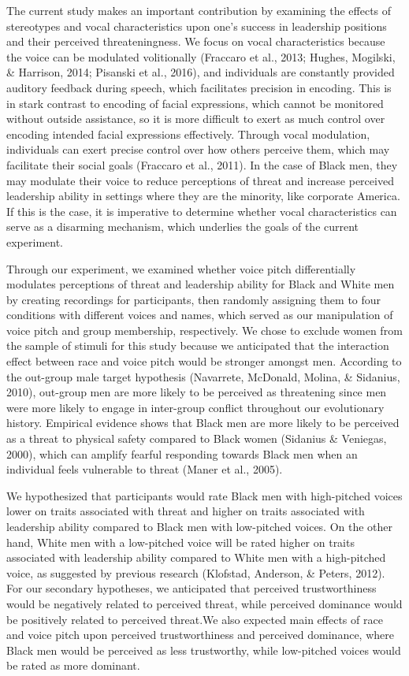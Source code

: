 \documentclass[
  english,
  man, noextraspace,floatsintext]{apa6}
\begin{document}
The current study makes an important contribution by examining the effects of stereotypes and vocal characteristics upon one's success in leadership positions and their perceived threateningness. We focus on vocal characteristics because the voice can be modulated volitionally (Fraccaro et al., 2013; Hughes, Mogilski, \& Harrison, 2014; Pisanski et al., 2016), and individuals are constantly provided auditory feedback during speech, which facilitates precision in encoding. This is in stark contrast to encoding of facial expressions, which cannot be monitored without outside assistance, so it is more difficult to exert as much control over encoding intended facial expressions effectively. Through vocal modulation, individuals can exert precise control over how others perceive them, which may facilitate their social goals (Fraccaro et al., 2011). In the case of Black men, they may modulate their voice to reduce perceptions of threat and increase perceived leadership ability in settings where they are the minority, like corporate America. If this is the case, it is imperative to determine whether vocal characteristics can serve as a disarming mechanism, which underlies the goals of the current experiment.

Through our experiment, we examined whether voice pitch differentially modulates perceptions of threat and leadership ability for Black and White men by creating recordings for participants, then randomly assigning them to four conditions with different voices and names, which served as our manipulation of voice pitch and group membership, respectively. We chose to exclude women from the sample of stimuli for this study because we anticipated that the interaction effect between race and voice pitch would be stronger amongst men. According to the out-group male target hypothesis (Navarrete, McDonald, Molina, \& Sidanius, 2010), out-group men are more likely to be perceived as threatening since men were more likely to engage in inter-group conflict throughout our evolutionary history. Empirical evidence shows that Black men are more likely to be perceived as a threat to physical safety compared to Black women (Sidanius \& Veniegas, 2000), which can amplify fearful responding towards Black men when an individual feels vulnerable to threat (Maner et al., 2005).

We hypothesized that participants would rate Black men with high-pitched voices lower on traits associated with threat and higher on traits associated with leadership ability compared to Black men with low-pitched voices. On the other hand, White men with a low-pitched voice will be rated higher on traits associated with leadership ability compared to White men with a high-pitched voice, as suggested by previous research (Klofstad, Anderson, \& Peters, 2012). For our secondary hypotheses, we anticipated that perceived trustworthiness would be negatively related to perceived threat, while perceived dominance would be positively related to perceived threat.We also expected main effects of race and voice pitch upon perceived trustworthiness and perceived dominance, where Black men would be perceived as less trustworthy, while low-pitched voices would be rated as more dominant.
\end{document}

